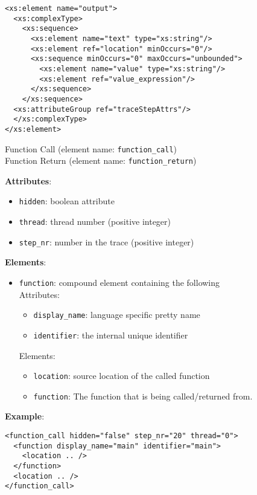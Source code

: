 \documentclass[12pt]{article}
\begin{document}
\begin{verbatim}
<xs:element name="output">
  <xs:complexType>
    <xs:sequence>
      <xs:element name="text" type="xs:string"/>
      <xs:element ref="location" minOccurs="0"/>
      <xs:sequence minOccurs="0" maxOccurs="unbounded">
        <xs:element name="value" type="xs:string"/>
        <xs:element ref="value_expression"/>
      </xs:sequence>
    </xs:sequence>
  <xs:attributeGroup ref="traceStepAttrs"/>
  </xs:complexType>
</xs:element>
\end{verbatim}


\begin{center}
  {\Large Function Call} (element name: \texttt{function\_call})\\
  {\Large Function Return} (element name: \texttt{function\_return})
\end{center}

\noindent\textbf{Attributes}:
\begin{itemize}
\item \texttt{hidden}: boolean attribute
\item \texttt{thread}: thread number (positive integer)
\item \texttt{step\_nr}: number in the trace (positive integer)
\end{itemize}

\noindent\textbf{Elements}:
\begin{itemize}
\item \texttt{function}: compound element containing the following\\
  Attributes:
  \begin{itemize}
  \item \texttt{display\_name}: language specific pretty name
  \item \texttt{identifier}: the internal unique identifier
  \end{itemize}
  Elements:
  \begin{itemize}
  \item \texttt{location}: source location of the called function
  \item \texttt{function}: The function that is being called/returned from.
  \end{itemize}
\end{itemize}

\noindent\textbf{Example}:
\begin{verbatim}
<function_call hidden="false" step_nr="20" thread="0">
  <function display_name="main" identifier="main">
    <location .. />
  </function>
  <location .. />
</function_call>
\end{verbatim}
\end{document}
